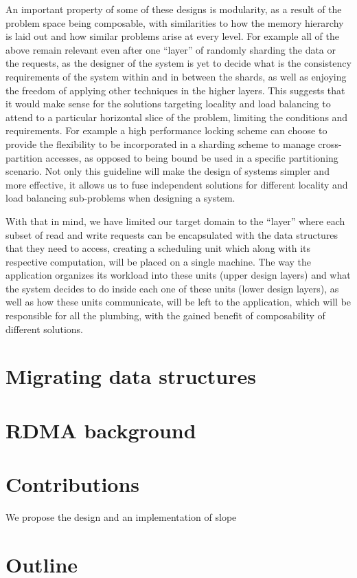An important property of some of these designs is modularity, as
a result of the problem space being composable, with similarities to how the
memory
hierarchy is laid out and how similar problems arise at every level. For
example all of the above remain
relevant even after one ``layer'' of randomly sharding the data or the requests,
as the designer of the system is yet to decide what is the consistency
requirements of the system within and in between the shards, as well as
enjoying the freedom of applying other techniques in the higher layers.
This suggests that
it would make sense for the solutions targeting locality and
load balancing to attend to a particular horizontal slice of the problem,
limiting the conditions and requirements. For example a high performance
locking scheme can choose to provide the flexibility to be incorporated in a
sharding scheme to manage cross-partition accesses, as opposed to being bound
be used in a specific partitioning scenario.
Not only this guideline
will make the design of systems simpler and more effective, it allows us to
fuse independent solutions for different locality and load balancing
sub-problems when designing a system.

With that in mind, we have limited our target domain to the ``layer'' where each
subset of read and write requests can be encapsulated with the data structures
that they need to access, creating a scheduling unit which along with its
respective computation, will be placed on a single machine. The way the
application organizes its workload into these units (upper design layers)
and what the system decides to do inside each one of these units (lower design
layers), as well as how these units communicate, will be left to the
application, which will be responsible for all the plumbing, with the gained
benefit of composability of different solutions.



\newpage



\section{Migrating data structures}






\section{RDMA background}






\section{Contributions}
We propose the design and an implementation of slope





\section{Outline}

